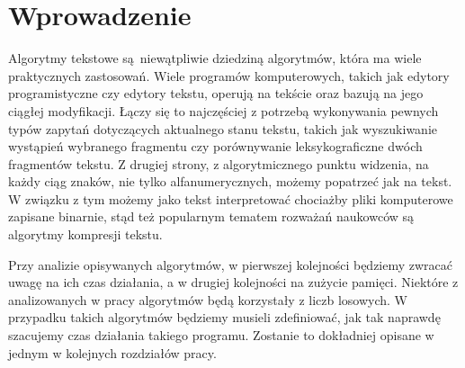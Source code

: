 \documentclass[declaration,shortabstract]{iithesis}
\author         {Michał Górniak}
\date          {11 września 2020}
\theoremstyle{definition} \newtheorem{definition}{Definicja}[chapter]
\theoremstyle{remark} \newtheorem{remark}[definition]{Obserwacja}
\theoremstyle{plain} \newtheorem{theorem}[definition]{Twierdzenie}
\theoremstyle{remark} \newtheorem{example}{Przykład}[definition]
\theoremstyle{plain} \newtheorem{lemma}[definition]{Lemat}
\begin{document}
\begin{comment}
    TODO:
    * usunięcie pojedynczych znaków z końca linii,
    * dowód lematu 3.2,
    * streszczenie,
    * bibliografia,
    * testy szybkościowe
\end{comment}

\chapter{Wprowadzenie}

Algorytmy tekstowe są~niewątpliwie dziedziną algorytmów, która ma wiele praktycznych zastosowań. Wiele programów komputerowych, takich jak edytory programistyczne czy edytory tekstu, operują na tekście oraz bazują na jego ciągłej modyfikacji. Łączy się to najczęściej z potrzebą wykonywania pewnych typów zapytań dotyczących aktualnego stanu tekstu, takich jak wyszukiwanie wystąpień wybranego fragmentu czy porównywanie leksykograficzne dwóch fragmentów tekstu. Z drugiej strony, z algorytmicznego punktu widzenia, na każdy ciąg znaków, nie tylko alfanumerycznych, możemy popatrzeć jak na tekst. W związku z tym możemy jako tekst interpretować chociażby pliki komputerowe zapisane binarnie, stąd też popularnym tematem rozważań naukowców są algorytmy kompresji tekstu.

Przy analizie opisywanych algorytmów, w pierwszej kolejności będziemy zwracać uwagę na ich czas działania, a w drugiej kolejności na zużycie pamięci. Niektóre z analizowanych w pracy algorytmów będą korzystały z liczb losowych. W przypadku takich algorytmów będziemy musieli zdefiniować, jak tak naprawdę szacujemy czas działania takiego programu. Zostanie to dokładniej opisane w jednym w kolejnych rozdziałów pracy.
\end{document}
